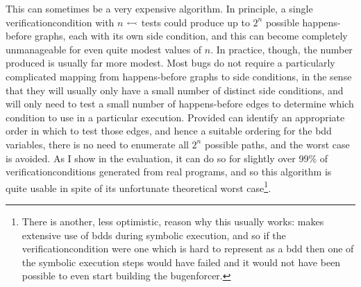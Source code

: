
This can sometimes be a very expensive algorithm.  In principle, a
single \gls{verificationcondition} with $n$ $\leftarrowtail$ tests
could produce up to $2^n$ possible happens-before graphs, each with
its own side condition, and this can become completely unmanageable
for even quite modest values of $n$.  In practice, though, the number
produced is usually far more modest.  Most bugs do not require a
particularly complicated mapping from happens-before graphs to side
conditions, in the sense that they will usually only have a small
number of distinct side conditions, and will only need to test a small
number of happens-before edges to determine which condition to use in
a particular execution.  Provided {\implementation} can identify an
appropriate order in which to test those edges, and hence a suitable
ordering for the \gls{bdd} variables, there is no need to enumerate
all $2^n$ possible paths, and the worst case is avoided.  As I show in
the evaluation, it can do so for slightly over 99\% of
\glspl{verificationcondition} generated from real programs, and so
this algorithm is quite usable in spite of its unfortunate theoretical
worst case\footnote{There is another, less optimistic, reason why this
  usually works: {\implementation} makes extensive use of
  \protect\glspl{bdd} during symbolic execution, and so if the
  \protect\gls{verificationcondition} were one which is hard to
  represent as a \protect\gls{bdd} then one of the symbolic execution
  steps would have failed and it would not have been possible to even
  start building the \protect\gls{bugenforcer}.}.

